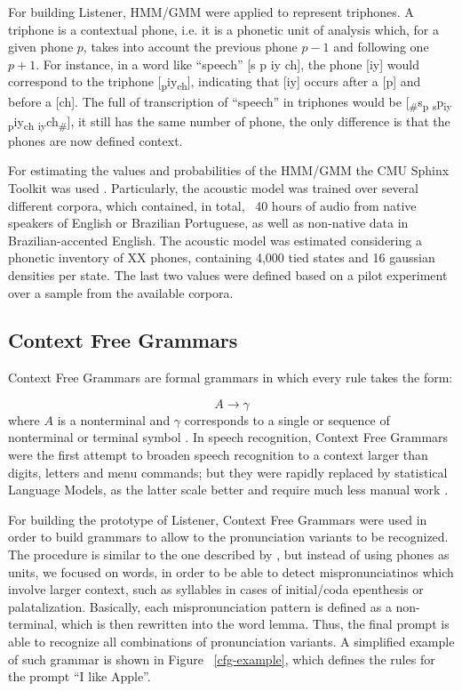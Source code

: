 \documentclass[twocolumn]{bmcart}%
\begin{document}
For building Listener, HMM/GMM were applied to represent triphones. A triphone is a contextual phone, i.e. it is a phonetic unit of analysis which, for a given phone $p$, takes into account the previous phone $p-1$ and following one $p+1$. For instance, in a word like ``speech'' [s p iy ch], the phone [iy] would correspond to the triphone [\textsubscript{p}iy\textsubscript{ch}], indicating that [iy] occurs after a [p] and before a [ch]. The full of transcription of ``speech'' in triphones would be [\textsubscript{\#}s\textsubscript{p} \textsubscript{s}p\textsubscript{iy} \textsubscript{p}iy\textsubscript{ch} \textsubscript{iy}ch\textsubscript{\#}], it still has the same number of phone, the only difference is that the phones are now defined context.

For estimating the values and probabilities of the HMM/GMM the CMU Sphinx Toolkit was used \cite{Walker2004}. 
Particularly, the acoustic model was trained over several different corpora, which contained, in total, ~40 hours of audio from native speakers of English or Brazilian Portuguese, as well as non-native data in Brazilian-accented English. The acoustic model was estimated considering a phonetic inventory of XX phones, containing 4,000 tied states and 16 gaussian densities per state. The last two values were defined based on a pilot experiment over a sample from the available corpora.


\subsection*{\textbf{Context Free Grammars}}

Context Free Grammars are formal grammars in which every rule takes the form:

\begin{equation}
A \rightarrow \gamma
\end{equation}
where $A$ is a nonterminal and $\gamma$ corresponds to a single or sequence of nonterminal or terminal symbol \cite{Jurafsky2000}. In speech recognition, Context Free Grammars were the first attempt to broaden speech recognition to a context larger than digits, letters and menu commands; but they were rapidly replaced by statistical Language Models, as the latter scale better and require much less manual work \cite{Gales2008}.

For building the prototype of Listener, Context Free Grammars were used in order to build grammars to allow to the pronunciation variants to be recognized. The procedure is similar to the one described by \citet{Srikanth2012}, but instead of using phones as units, we focused on words, in order to be able to detect mispronunciatinos which involve larger context, such as syllables in cases of initial/coda epenthesis or palatalization. Basically, each mispronunciation pattern is defined as a non-terminal, which is then rewritten into the word lemma. Thus, the final prompt is able to recognize all combinations of pronunciation variants. A simplified example of such grammar is shown in Figure ~\ref{cfg-example}, which defines the rules for the prompt ``I like Apple''. 
\end{document}
